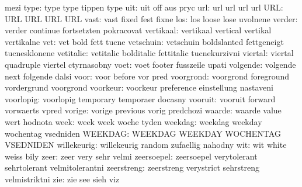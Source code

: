                       mezi
               type:  type                 type                tippen
                      type
                uit:  uit                  off                 aus
                      pryc
                url:  url                  url                 url
                      url
                URL:  URL                  URL                 URL
                      URL
               vast:  vast                 fixed               fest
                      fixne
                los:  los                  loose               lose
                      uvolnene
             verder:  verder               continue            fortsetzten
                      pokracovat
          vertikaal:  vertikaal            vertical            vertikal
                      vertikalne
                vet:  vet                  bold                fett
                      tucne
          vetschuin:  vetschuin            boldslanted         fettgeneigt
                      tucnesklonene
          vetitalic:  vetitalic            bolditalic          fettitalic
                      tucnekurzivni
            viertal:  viertal              quadruple           viertel
                      ctyrnasobny
               voet:  voet                 footer              fusszeile
                      upati
           volgende:  volgende             next                folgende
                      dalsi
               voor:  voor                 before              vor
                      pred
          voorgrond:  voorgrond            foreground          vordergrund
                      voorgrond %
           voorkeur:  voorkeur             preference          einstellung
                      nastaveni
          voorlopig:  voorlopig            temporary           temporaer
                      docasny
            vooruit:  vooruit              forward             vorwaerts
                      vpred
             vorige:  vorige               previous            vorig
                      predchozi
             waarde:  waarde               value               wert
                      hodnota
               week:  week                 week                woche
                      tyden
            weekdag:  weekdag              weekday             wochentag
                      vsedniden
            WEEKDAG:  WEEKDAG              WEEKDAY             WOCHENTAG
                      VSEDNIDEN
        willekeurig:  willekeurig          random              zufaellig
                      nahodny
                wit:  wit                  white               weiss
                      bily
               zeer:  zeer                 very                sehr
                      velmi
         zeersoepel:  zeersoepel           verytolerant        sehrtolerant
                      velmitolerantni
         zeerstreng:  zeerstreng           verystrict          sehrstreng
                      velmistriktni
                zie:  zie                  see                 sieh
                      viz

